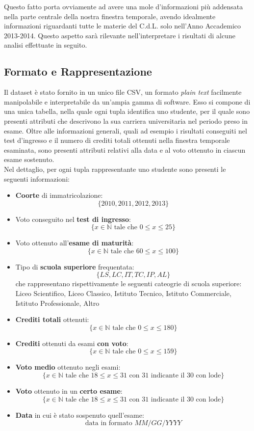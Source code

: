Questo fatto porta ovviamente ad avere una mole d'informazioni più addensata nella parte centrale della nostra finestra temporale, avendo idealmente informazioni riguardanti tutte le materie del C.d.L. solo nell'Anno Accademico 2013-2014. Questo aspetto sarà rilevante nell'interpretare i risultati di alcune analisi effettuate in seguito.

\subsection{Formato e Rappresentazione}

Il dataset è stato fornito in un unico file CSV, un formato \textit{plain text} facilmente manipolabile e interpretabile da un'ampia gamma di software. Esso si compone di una unica tabella, nella quale ogni tupla identifica uno studente, per il quale sono presenti attributi che descrivono la sua carriera universitaria nel periodo preso in esame. Oltre alle informazioni generali, quali ad esempio i risultati conseguiti nel test d'ingresso e il numero di crediti totali ottenuti nella finestra temporale esaminata, sono presenti attributi relativi alla data e al voto ottenuto in ciascun esame sostenuto. \\

Nel dettaglio, per ogni tupla rappresentante uno studente sono presenti le seguenti informazioni:

\begin{itemize}
	\item \textbf{Coorte} di immatricolazione: $$ \{2010, 2011, 2012, 2013\} $$
	\item Voto conseguito nel \textbf{test di ingresso}: $$ \{ x \in \mathbb{N} \text{ tale che } 0 \leq x \leq 25\} $$
	\item Voto ottenuto all'\textbf{esame di maturità}: $$ \{ x \in \mathbb{N} \text{ tale che } 60 \leq x \leq 100\} $$
	\item Tipo di \textbf{scuola superiore} frequentata: $$ \{LS, LC, IT, TC, IP, AL \} $$ che rappresentano rispettivamente le seguenti cateogrie di scuola superiore: Liceo Scientifico, Liceo Classico, Istituto Tecnico, Istituto Commerciale, Istituto Professionale, Altro
	\item \textbf{Crediti totali} ottenuti: $$ \{ x \in \mathbb{N} \text{ tale che } 0 \leq x \leq 180\} $$
	\item \textbf{Crediti} ottenuti da esami \textbf{con voto}: $$ \{ x \in \mathbb{N} \text{ tale che } 0 \leq x \leq 159\} $$
	\item \textbf{Voto medio} ottenuto negli esami: $$ \{ x \in \mathbb{N} \text{ tale che } 18 \leq x \leq 31 \text { con 31 indicante il 30 con lode}\} $$
	\item \textbf{Voto} ottenuto in un \textbf{certo esame}: $$ \{ x \in \mathbb{N} \text{ tale che } 18 \leq x \leq 31 \text { con 31 indicante il 30 con lode}\} $$
	\item \textbf{Data} in cui è stato sospenuto quell'esame: $$ \text{data in formato }MM/GG/YYYY $$
\end{itemize}

